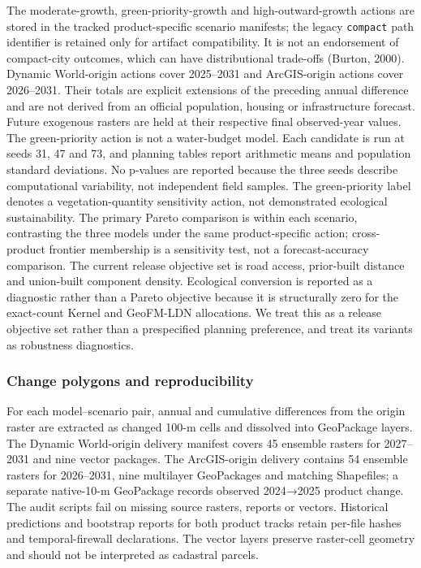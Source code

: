 The moderate-growth, green-priority-growth and high-outward-growth
actions are stored in the tracked product-specific scenario manifests;
the legacy \texttt{compact} path identifier is retained only for
artifact compatibility. It is not an endorsement of compact-city
outcomes, which can have distributional trade-offs (Burton, 2000).
Dynamic World-origin actions cover 2025--2031 and ArcGIS-origin actions
cover 2026--2031. Their totals are explicit extensions of the preceding
annual difference and are not derived from an official population,
housing or infrastructure forecast. Future exogenous rasters are held at
their respective final observed-year values. The green-priority action
is not a water-budget model. Each candidate is run at seeds 31, 47 and
73, and planning tables report arithmetic means and population standard
deviations. No p-values are reported because the three seeds describe
computational variability, not independent field samples. The
green-priority label denotes a vegetation-quantity sensitivity action,
not demonstrated ecological sustainability. The primary Pareto
comparison is within each scenario, contrasting the three models under
the same product-specific action; cross-product frontier membership is a
sensitivity test, not a forecast-accuracy comparison. The current
release objective set is road access, prior-built distance and
union-built component density. Ecological conversion is reported as a
diagnostic rather than a Pareto objective because it is structurally
zero for the exact-count Kernel and GeoFM-LDN allocations. We treat this
as a release objective set rather than a prespecified planning
preference, and treat its variants as robustness diagnostics.

\subsubsection{Change polygons and
reproducibility}\label{change-polygons-and-reproducibility}

For each model--scenario pair, annual and cumulative differences from
the origin raster are extracted as changed 100-m cells and dissolved
into GeoPackage layers. The Dynamic World-origin delivery manifest
covers 45 ensemble rasters for 2027--2031 and nine vector packages. The
ArcGIS-origin delivery contains 54 ensemble rasters for 2026--2031, nine
multilayer GeoPackages and matching Shapefiles; a separate native-10-m
GeoPackage records observed 2024→2025 product change. The audit scripts
fail on missing source rasters, reports or vectors. Historical
predictions and bootstrap reports for both product tracks retain
per-file hashes and temporal-firewall declarations. The vector layers
preserve raster-cell geometry and should not be interpreted as cadastral
parcels.

